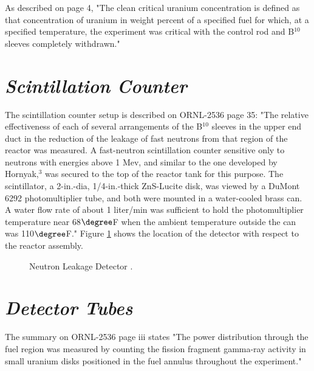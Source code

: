 \documentclass[ms,a4paper]{memoir}
\begin{document}
As described on page 4, "The clean critical uranium concentration is defined as that concentration of uranium in weight percent of a specified fuel for which, at a specified temperature, the experiment was critical with the control rod and B$^{10}$ sleeves completely withdrawn."

\section{\emph{Scintillation Counter}}

The scintillation counter setup is described on ORNL-2536 page 35: "The relative effectiveness of each of several arrangements of the B$^{10}$ sleeves in the upper end duct in the reduction of the leakage of fast neutrons from that region of the reactor was measured. A fast-neutron scintillation counter sensitive only to neutrons with energies above 1 Mev, and similar to the one developed by Hornyak,$^3$ was secured to the top of the reactor tank for this purpose. The scintillator, a 2-in.-dia, 1/4-in.-thick ZnS-Lucite disk, was viewed by a DuMont 6292 photomultiplier tube, and both were mounted in a water-cooled brass can. A water flow rate of about 1 liter/min was sufficient to hold the photomultiplier temperature near 68$\degree$F when the ambient temperature outside the can was 110$\degree$F." Figure \ref{fig6} shows the location of the detector with respect to the reactor assembly.

\begin{figure}[H]
  \centering
  \caption{Neutron Leakage Detector \parencite[Figure 16]{ornl-2536}.}
  \label{fig6}
\end{figure}

\section{\emph{Detector Tubes}}

The summary on ORNL-2536 page iii states "The power distribution through the fuel region was measured by counting the fission fragment  gamma-ray activity in small uranium disks positioned in the fuel annulus throughout the experiment."
\end{document}
